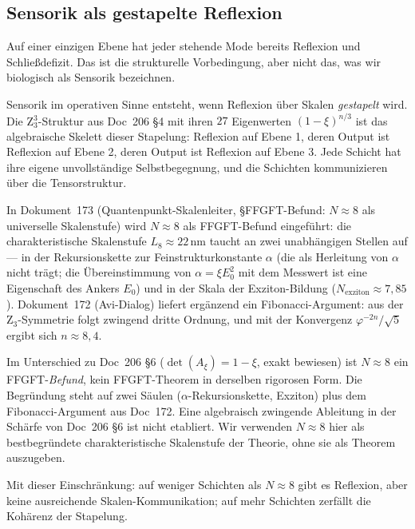 \subsection{Sensorik als gestapelte Reflexion}\label{sec:reflexion_stapel}

Auf einer einzigen Ebene hat jeder stehende Mode bereits Reflexion und Schließdefizit. Das ist die strukturelle Vorbedingung, aber nicht das, was wir biologisch als Sensorik bezeichnen.

Sensorik im operativen Sinne entsteht, wenn Reflexion über Skalen \emph{gestapelt} wird. Die Z$_3^3$-Struktur aus Doc~206 \S4 mit ihren $27$ Eigenwerten $(1-\xi)^{n/3}$ ist das algebraische Skelett dieser Stapelung: Reflexion auf Ebene 1, deren Output ist Reflexion auf Ebene 2, deren Output ist Reflexion auf Ebene 3. Jede Schicht hat ihre eigene unvollständige Selbstbegegnung, und die Schichten kommunizieren über die Tensorstruktur.

In Dokument~173 (Quantenpunkt-Skalenleiter, \S\glqq FFGFT-Befund: $N \approx 8$ als universelle Skalenstufe\grqq) wird $N \approx 8$ als FFGFT-Befund eingeführt: die charakteristische Skalenstufe $L_8 \approx 22$\,nm taucht an zwei unabhängigen Stellen auf --- in der Rekursionskette zur Feinstrukturkonstante $\alpha$ (die als Herleitung von $\alpha$ nicht trägt; die Übereinstimmung von $\alpha = \xi E_0^2$ mit dem Messwert ist eine Eigenschaft des Ankers $E_0$) und in der Skala der Exziton-Bildung ($N_{\text{exziton}} \approx 7{,}85$). Dokument~172 (Avi-Dialog) liefert ergänzend ein Fibonacci-Argument: aus der Z$_3$-Symmetrie folgt zwingend dritte Ordnung, und mit der Konvergenz $\varphi^{-2n}/\sqrt{5}$ ergibt sich $n \approx 8{,}4$.

\begin{important}
Im Unterschied zu Doc~206 \S6 ($\det(A_\xi) = 1-\xi$, exakt bewiesen) ist $N \approx 8$ ein FFGFT-\emph{Befund}, kein FFGFT-Theorem in derselben rigorosen Form. Die Begründung steht auf zwei Säulen ($\alpha$-Rekursionskette, Exziton) plus dem Fibonacci-Argument aus Doc~172. Eine algebraisch zwingende Ableitung in der Schärfe von Doc~206 \S6 ist nicht etabliert. Wir verwenden $N \approx 8$ hier als bestbegründete charakteristische Skalenstufe der Theorie, ohne sie als Theorem auszugeben.
\end{important}

Mit dieser Einschränkung: auf weniger Schichten als $N \approx 8$ gibt es Reflexion, aber keine ausreichende Skalen-Kommunikation; auf mehr Schichten zerfällt die Kohärenz der Stapelung.

